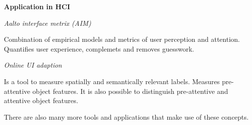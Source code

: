 \textbf{Application in HCI} \smallskip

\textit{Aalto interface metrix (AIM)} \smallskip

Combination of empirical models and metrics of user perception and attention. 
Quantifies user experience, complemets and removes guesswork. \medskip


\textit{Online UI adaption} \smallskip

Is a tool to measure spatially and semantically relevant labels. Measures pre-attentive object features. It is also possible to distinguish pre-attentive and attentive object features. \medskip

There are also many more tools and applications that make use of these concepts. 




